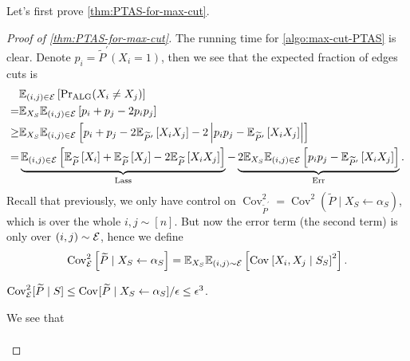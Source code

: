 Let's first prove \autoref{thm:PTAS-for-max-cut}.

\begin{proof}[Proof of \autoref{thm:PTAS-for-max-cut}]
	The running time for \autoref{algo:max-cut-PTAS} is clear. Denote \(p_i = \widetilde{P} ^\prime (X_i = 1)\), then we see that the expected fraction of edges cuts is
	\[
		\begin{split}
			&\mathbb{E}_{(i, j)\in \mathcal{\MakeUppercase{e}} }\left[ \Pr\nolimits_{\mathrm{ALG}}(X_i \neq X_j) \right]\\
			=& \mathbb{E}_{X_S}\mathbb{E}_{(i, j)\in \mathcal{\MakeUppercase{e}} }\left[p_i + p_j - 2 p_i p_j \right]\\
			\geq& \mathbb{E}_{X_S}\mathbb{E}_{(i, j)\in \mathcal{\MakeUppercase{e}} }\left[ p_i + p_j - 2 \mathbb{E}_{\widetilde{P} ^\prime }\left[X_i X_j \right] - 2 \left\vert p_i p_j - \mathbb{E}_{\widetilde{P} ^\prime }\left[X_i X_j \right]  \right\vert  \right]\\
			=& \underbrace{\mathbb{E}_{(i, j)\in \mathcal{\MakeUppercase{e}} }\left[ \mathbb{E}_{\widetilde{P} }\left[X_i \right] + \mathbb{E}_{\widetilde{P} }\left[X_j \right] - 2 \mathbb{E}_{\widetilde{P} }\left[ X_i X_j\right]  \right]}_{\mathrm{Lass}} - \underbrace{2 \mathbb{E}_{X_S} \mathbb{E}_{(i, j)\in \mathcal{\MakeUppercase{e}} }\left[ p_i p_j - \mathbb{E}_{\widetilde{P} ^\prime }\left[ X_i X_j\right] \right]}_{\mathrm{Err}}.
		\end{split}
	\]
	Recall that previously, we only have control on \(\mathop{\mathrm{Cov}}\nolimits_{\widetilde{P} ^\prime }^{2} = \mathop{\mathrm{Cov}}^2(\widetilde{P} \mid X_S\gets \alpha _S)\), which is over the whole \(i, j\sim[n]\). But now the error term (the second term) is only over \((i, j)\sim \mathcal{\MakeUppercase{e}} \), hence we define
	\[
		\mathop{\mathrm{Cov}}\nolimits_{\mathcal{\MakeUppercase{E}} }^2\left[ \widetilde{P} \mid X_S \gets \alpha _S\right]
		= \mathbb{E}_{X_S} \mathbb{E}_{(i, j)\sim \mathcal{\MakeUppercase{e}} }\left[ \mathop{\mathrm{Cov}}\nolimits_{}\left[X_i , X_j \mid S_S \right]^{2}\right].
	\]
	\begin{claim}
		\(\mathop{\mathrm{Cov}}\nolimits_{\mathcal{\MakeUppercase{e}} }^2 [ \widetilde{P} \mid S ] \leq \mathop{\mathrm{Cov}}\nolimits_{}[\widetilde{P} \mid X_S \gets \alpha _S ] / \epsilon \leq \epsilon ^3 \).
	\end{claim}
	\begin{explanation}
		We see that
		\[
			\begin{split}

\end{split}\]
\end{explanation}
\end{proof}
